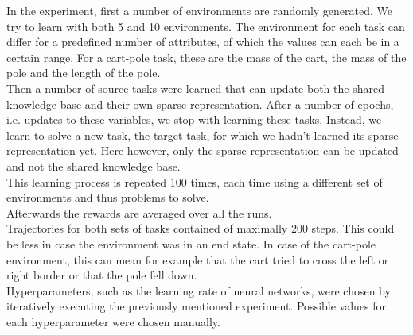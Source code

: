 In the experiment, first a number of environments are randomly generated. We try to learn with both 5 and 10 environments.
The environment for each task can differ for a predefined number of attributes, of which the values can each be in a certain range. For a cart-pole task, these are the mass of the cart, the mass of the pole and the length of the pole.\\
Then a number of source tasks were learned that can update both the shared knowledge base and their own sparse representation. After a number of epochs, i.e. updates to these variables, we stop with learning these tasks. Instead, we learn to solve a new task, the target task, for which we hadn't learned its sparse representation yet. Here however, only the sparse representation can be updated and not the shared knowledge base.\\
This learning process is repeated 100 times, each time using a different set of environments and thus problems to solve.\\
Afterwards the rewards are averaged over all the runs.\\
Trajectories for both sets of tasks contained of maximally 200 steps. This could be less in case the environment was in an end state. In case of the cart-pole environment, this can mean for example that the cart tried to cross the left or right border or that the pole fell down.\\
Hyperparameters, such as the learning rate of neural networks, were chosen by iteratively executing the previously mentioned experiment. Possible values for each hyperparameter were chosen manually.
